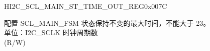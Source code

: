 \begin{register}{H}{I2C\_SCL\_MAIN\_ST\_TIME\_OUT\_REG}{0x007C}\label{regdesc:I2CSCLMAINSTTIMEOUTREG}
%
%
\regnewline%
\begin{regdesc}\begin{reglist}
\label{fielddesc:I2CSCLMAINSTTOI2C}\item [I2C\_SCL\_MAIN\_ST\_TO\_I2C] 配置 SCL\_MAIN\_FSM 状态保持不变的最大时间，不能大于 23。\\
单位：I2C\_SCLK 时钟周期数 \\ (R/W)
\end{reglist}\end{regdesc}
\end{register}


